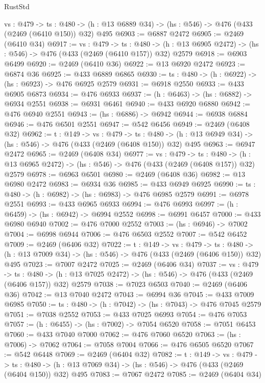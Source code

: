 \begin{lexlean}{RustStd}
\begin{coremodule}
  {vs : @479} ->
  {ts : @480} -> (h : @13 @6889 @34) -> (hs : @546) -> @476 (@433 (@2469 (@6410 @150)) @32) @495
@6903 := @6887 @2472
@6905 := @2469 (@6410 @34)
@6917 := {vs : @479} ->
  {ts : @480} -> (h : @13 @6905 @2472) -> (hs : @546) -> @476 (@433 (@2469 (@6410 @157)) @32) @2579
@6918 := @6903 @6499
@6920 := @2469 (@6410 @36)
@6922 := @13 @6920 @2472
@6923 := @6874 @36
@6925 := @433 @6889 @6865
@6930 := {ts : @480} -> (h : @6922) -> (hs : @6923) -> @476 @6925 @2579
@6931 := @6918 @2550
@6933 := @433 @6905 @6873
@6934 := @476 @6933
@6937 := (h : @6463) -> (hs : @6882) -> @6934 @2551
@6938 := @6931 @6461
@6940 := @433 @6920 @6880
@6942 := @476 @6940 @2551
@6943 := (hs : @6886) -> @6942
@6944 := @6938 @6884
@6946 := @476 @6501 @2551
@6947 := @542 @6456
@6949 := @2469 (@6408 @32)
@6962 := {t : @149} ->
  {vs : @479} ->
  {ts : @480} -> (h : @13 @6949 @34) -> (hs : @546) -> @476 (@433 (@2469 (@6408 @150)) @32) @495
@6963 := @6947 @2472
@6965 := @2469 (@6408 @34)
@6977 := {vs : @479} ->
  {ts : @480} -> (h : @13 @6965 @2472) -> (hs : @546) -> @476 (@433 (@2469 (@6408 @157)) @32) @2579
@6978 := @6963 @6501
@6980 := @2469 (@6408 @36)
@6982 := @13 @6980 @2472
@6983 := @6934 @36
@6985 := @433 @6949 @6925
@6990 := {ts : @480} -> (h : @6982) -> (hs : @6983) -> @476 @6985 @2579
@6991 := @6978 @2551
@6993 := @433 @6965 @6933
@6994 := @476 @6993
@6997 := (h : @6459) -> (hs : @6942) -> @6994 @2552
@6998 := @6991 @6457
@7000 := @433 @6980 @6940
@7002 := @476 @7000 @2552
@7003 := (hs : @6946) -> @7002
@7004 := @6998 @6944
@7006 := @476 @6503 @2552
@7007 := @542 @6452
@7009 := @2469 (@6406 @32)
@7022 := {t : @149} ->
  {vs : @479} ->
  {ts : @480} -> (h : @13 @7009 @34) -> (hs : @546) -> @476 (@433 (@2469 (@6406 @150)) @32) @495
@7023 := @7007 @2472
@7025 := @2469 (@6406 @34)
@7037 := {vs : @479} ->
  {ts : @480} -> (h : @13 @7025 @2472) -> (hs : @546) -> @476 (@433 (@2469 (@6406 @157)) @32) @2579
@7038 := @7023 @6503
@7040 := @2469 (@6406 @36)
@7042 := @13 @7040 @2472
@7043 := @6994 @36
@7045 := @433 @7009 @6985
@7050 := {ts : @480} -> (h : @7042) -> (hs : @7043) -> @476 @7045 @2579
@7051 := @7038 @2552
@7053 := @433 @7025 @6993
@7054 := @476 @7053
@7057 := (h : @6455) -> (hs : @7002) -> @7054 @6520
@7058 := @7051 @6453
@7060 := @433 @7040 @7000
@7062 := @476 @7060 @6520
@7063 := (hs : @7006) -> @7062
@7064 := @7058 @7004
@7066 := @476 @6505 @6520
@7067 := @542 @6448
@7069 := @2469 (@6404 @32)
@7082 := {t : @149} ->
  {vs : @479} ->
  {ts : @480} -> (h : @13 @7069 @34) -> (hs : @546) -> @476 (@433 (@2469 (@6404 @150)) @32) @495
@7083 := @7067 @2472
@7085 := @2469 (@6404 @34)

\end{coremodule}
\end{lexlean}
